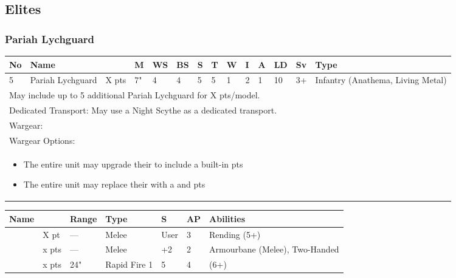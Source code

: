 \subsection{Elites}

\subsubsection{Pariah Lychguard}

\noindent
\begin{tabular}{||m{10pt} m{90pt} m{30pt} m{11pt} m{11pt} m{11pt} m{11pt} m{11pt} m{11pt} m{11pt} m{11pt} m{11pt} m{11pt} m{135pt}||}
	\hline
	No & Name & & M & WS & BS & S & T & W & I & A & LD & Sv & Type \\
	\hline
	5 & Pariah Lychguard & X pts & 7" & 4 & 4 & 5 & 5 & 1 & 2 & 1 & 10 & 3+ & Infantry (Anathema, Living Metal)\\
	\hline
	\hline
	\multicolumn{14}{||Z{532 pt}||}{May include up to 5 additional Pariah Lychguard for X pts/model.}\\	
	\multicolumn{14}{||Z{532 pt}||}{Dedicated Transport: May use a Night Scythe as a dedicated transport.}\\
	\hline
	\hline
	\multicolumn{14}{||Z{532 pt}||}{Wargear: \quickref{Warscythe}}\\
	\multicolumn{14}{||Z{532 pt}||}{Wargear Options:} \\
	\multicolumn{14}{||Z{532 pt}||}{\begin{itemize}
			\item The entire unit may upgrade their \quickref{Warscythe} to include a built-in \quickref{Gauss Blaster} \hrulefill 5 pts
			\item The entire unit may replace their \quickref{Warscythe} with a \quickref{Hyperphase Sword} and \quickref{Dispersion Shield} \hrulefill 10 pts
		\end{itemize}} \\
	\hline
\end{tabular}

\noindent
\begin{tabular}{||m{110pt} m{30pt} m{31pt} m{55pt} m{12pt} m{12pt} m{210pt}||}
	\hline
	Name & & Range & Type & S & AP & Abilities \\
	\hline
	\quickref{Hyperphase Sword} & X pt & — & Melee & User & 3 & Rending (5+) \\
	\quickref{Warscythe} & x pts& — & Melee & +2 & 2 & Armourbane (Melee), Two-Handed \\
	\quickref{Gauss Blaster} & x pts& 24" & Rapid Fire 1 & 5 & 4 & \quickref{Gauss} (6+) \\
	\hline
\end{tabular}

